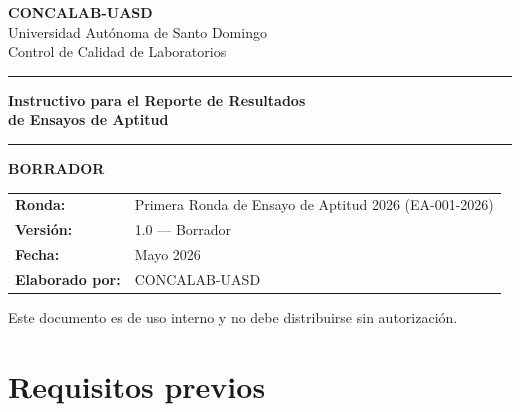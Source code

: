 \documentclass[12pt, letterpaper]{article}
\begin{document}
\begin{titlepage}
  \centering
  \vspace*{1.5cm}

  {\Huge\bfseries\color{azuluasd} CONCALAB-UASD}\\[0.4cm]
  {\large\color{gray} Universidad Autónoma de Santo Domingo}\\[0.2cm]
  {\large\color{gray} Control de Calidad de Laboratorios}

  \vspace{1.5cm}
  \noindent\color{doradouasd}\rule{\linewidth}{2pt}
  \vspace{0.5cm}

  {\LARGE\bfseries\color{azuluasd}
    Instructivo para el Reporte de Resultados\\[0.3cm]
    de Ensayos de Aptitud}

  \vspace{0.5cm}
  \noindent\color{doradouasd}\rule{\linewidth}{2pt}

  \vspace{1.2cm}
  \colorbox{doradouasd}{%
    \parbox{6cm}{\centering\large\bfseries\color{azuluasd} BORRADOR}%
  }

  \vfill

  \begin{tabular}{ll}
    \textbf{Ronda:}    & Primera Ronda de Ensayo de Aptitud 2026 (EA-001-2026) \\[4pt]
    \textbf{Versión:}  & 1.0 — Borrador \\[4pt]
    \textbf{Fecha:}    & Mayo 2026 \\[4pt]
    \textbf{Elaborado por:} & CONCALAB-UASD \\
  \end{tabular}

  \vspace{1.5cm}
  {\small\color{gray} Este documento es de uso interno y no debe distribuirse sin autorización.}
\end{titlepage}

\tableofcontents
\newpage

\section{Requisitos previos}
\end{document}
